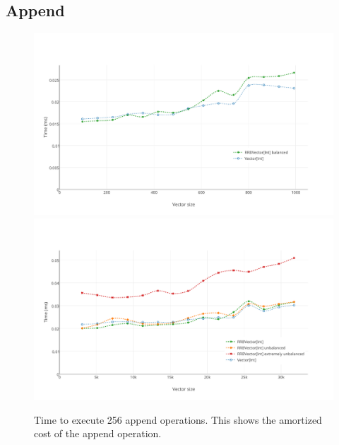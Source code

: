 \subsection{Append}

\begin{figure}[h!]
  \centering
  \includegraphics[width=\textwidth]{Benchmarks/Append_2.pdf}
  \includegraphics[width=\textwidth]{Benchmarks/Append_3.pdf}
  \label{AppendBenchmarks}
  \caption{Time to execute 256 append operations. This shows the amortized cost of the append operation.}
\end{figure}


